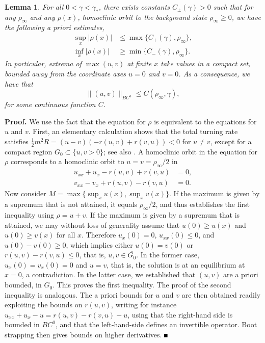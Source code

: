 \documentclass[10pt]{article}
\newtheorem{Lemma}{Lemma}[section]
\newenvironment{Proof}%
 {\begin{trivlist} \item[]{\bf Proof. }}%
 {\hspace*{\fill}$\rule{.4\baselineskip}{.4\baselineskip}$\end{trivlist}}
\renewcommand{\leq}{\leqslant}
\renewcommand{\geq}{\geqslant}
\begin{document}
\begin{Lemma}\label{l:mm}
For all $0<\gamma<\gamma_*$, there exists constants $C_\pm(\gamma)>0$ such that for any $\rho_\infty$ and any  $\rho(x)$, homoclinic orbit to the background state $\rho_\infty\geq 0$, we have the following a priori estimates,
\begin{align*}
\sup_x|\rho(x)|&\leq \max\{C_+(\gamma),\rho_\infty\},\\
\inf_x|\rho(x)|&\geq \min\{C_-(\gamma),\rho_\infty\}.
\end{align*}
In particular, extrema of $\max (u,v)$ at finite $x$ take values in a compact set, bounded away from the coordinate axes $u=0$ and $v=0$. As a consequence, we have that 
\[
 \|(u,v)\|_{BC^3}\leq C(\rho_\infty,\gamma),
\]
for some continuous function $C$.
\end{Lemma}
\begin{Proof}
 We use the fact that the equation for $\rho$ is equivalent to the equations for $u$ and $v$. First, an elementary calculation shows that the total turning rate satisfies $\frac{1}{2}m^2R=(u-v)(-r(u,v)+r(v,u))<0$ for $u\neq v$, except for a compact region $G_0\subset \{u,v>0\}$; see also \cite{scheel2016wavenumber}. A homoclinic orbit in the equation for $\rho$ corresponds to a homoclinic orbit to $u=v=\rho_\infty/2$ in 
 \begin{align*}
  u_{xx}+u_x-r(u,v)+r(v,u)&=0,\\
  v_{xx}-v_x+r(u,v)-r(v,u)&=0.
 \end{align*}
 Now consider $M=\max\{\sup_x u(x),\sup_x v(x)\}$. If the maximum is given by a supremum that is not attained, it equals $\rho_\infty/2$, and thus establishes the first inequality using $\rho=u+v$. If the maximum is given by a supremum that is attained, we may without loss of generality assume that $u(0)\geq u(x)$ and $u(0)\geq v(x)$ for all $x$. Therefore $u_x(0)=0$, $u_{xx}(0)\leq 0$, and $u(0)-v(0)\geq 0$, which implies either $u(0)=v(0)$ or $r(u,v)-r(v,u)\leq 0$, that is, $u,v\in \overline{G_0}$. In the former case, $u_x(0)=v_x(0)=0$ and $u=v$, that is, the solution is at an equilibrium at $x=0$, a contradiction. In the latter case, we established that $(u,v)$ are a priori bounded, in $G_0$. This proves the first inequality. The proof of the second inequality is analogous. The a priori bounds for $u$ and $v$ are then obtained readily exploiting the bounds on $r(u,v)$, writing for instance $u_{xx}+u_x-u=r(u,v)-r(v,u)-u$, using that the right-hand side is bounded in $BC^0$, and that the left-hand-side defines an invertible operator. Boot strapping then gives bounds on higher derivatives.
\end{Proof}
\end{document}

